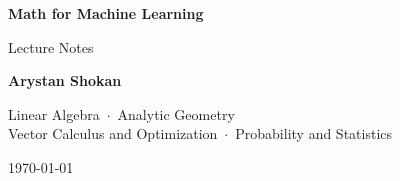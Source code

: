 \documentclass[11pt, twoside, openright]{book}
\theoremstyle{definition}
\theoremstyle{plain}
\theoremstyle{remark}
\begin{document}
\frontmatter

\begin{titlepage}
    \centering
    \vspace*{0.28\textheight}
    
    {\Huge\bfseries Math for Machine Learning\par}
    \vspace{0.8em}
    
    {\Large Lecture Notes\par}
    \vspace{2em}
    
    {\large\bfseries Arystan Shokan\par} 
    \vspace{2.5em}
    
    {\large Linear Algebra \,$\cdot$\, Analytic Geometry\\[0.4em]
    Vector Calculus and Optimization \,$\cdot$\, Probability and Statistics\par}
    
    \vfill
    {\large \today\par}
\end{titlepage}


\tableofcontents

\mainmatter






\appendix


\end{document}
